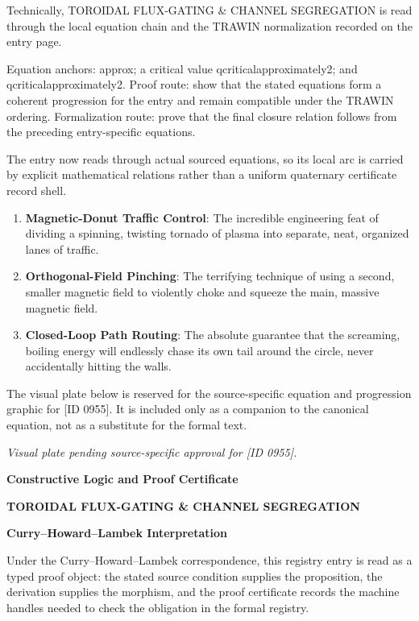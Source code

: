 Technically, TOROIDAL FLUX-GATING \& CHANNEL SEGREGATION is read through the local equation chain and the TRAWIN normalization recorded on the entry page.

Equation anchors: approx; a critical value qcriticalapproximately2; and qcriticalapproximately2. Proof route: show that the stated equations form a coherent progression for the entry and remain compatible under the TRAWIN ordering. Formalization route: prove that the final closure relation follows from the preceding entry-specific equations.

The entry now reads through actual sourced equations, so its local arc is carried by explicit mathematical relations rather than a uniform quaternary certificate record shell.
\endgroup

\begin{enumerate}[leftmargin=1.6em,itemsep=6pt,topsep=4pt]
\item \textbf{Magnetic-Donut Traffic Control}: The incredible engineering feat of dividing a spinning, twisting tornado of plasma into separate, neat, organized lanes of traffic.
\item \textbf{Orthogonal-Field Pinching}: The terrifying technique of using a second, smaller magnetic field to violently choke and squeeze the main, massive magnetic field.
\item \textbf{Closed-Loop Path Routing}: The absolute guarantee that the screaming, boiling energy will endlessly chase its own tail around the circle, never accidentally hitting the walls.
\end{enumerate}

\begingroup\footnotesize\sloppy
The visual plate below is reserved for the source-specific equation and progression graphic for [ID 0955]. It is included only as a companion to the canonical equation, not as a substitute for the formal text.
\par\endgroup
\begingroup\footnotesize\itshape
Visual plate pending source-specific approval for [ID 0955].
\par\endgroup

\clearpage
\begingroup\tzpsupportsetup
\noindent\textbf{\fontsize{10.8pt}{12.8pt}\selectfont [ID 0955] Constructive Logic and Proof Certificate}\par
\noindent\textbf{\fontsize{10pt}{12pt}\selectfont TOROIDAL FLUX-GATING \& CHANNEL SEGREGATION}\par
\vspace{0.45em}
\begingroup
\footnotesize
\setlength{\parskip}{0.22em}
\setlength{\parindent}{0pt}
\noindent\textbf{Curry--Howard--Lambek Interpretation}\par
Under the Curry--Howard--Lambek correspondence, this registry entry is read as a typed proof
object: the stated source condition supplies the proposition, the derivation supplies the
morphism, and the proof certificate records the machine handles needed to check the obligation
in the formal registry.

